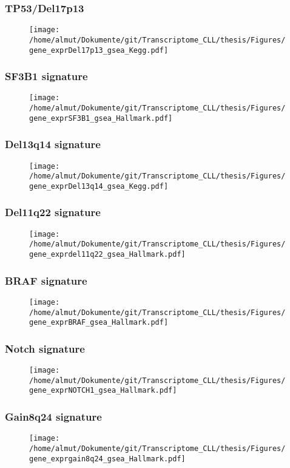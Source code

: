 \documentclass[xcolor=dvipsnames,t,10pt]{beamer}
\begin{document}
%
%
\begin{frame}[c]
	\frametitle{TP53/Del17p13}
	\begin{figure}
		\centering
		\texttt{[image: /home/almut/Dokumente/git/Transcriptome\_CLL/thesis/Figures/gene\_exprDel17p13\_gsea\_Kegg.pdf]}
	\end{figure}
\end{frame}
%
%
\begin{frame}[c]
	\frametitle{SF3B1 signature}
	\begin{figure}
		\centering
		\texttt{[image: /home/almut/Dokumente/git/Transcriptome\_CLL/thesis/Figures/gene\_exprSF3B1\_gsea\_Hallmark.pdf]}
	\end{figure}
\end{frame}
%
%
\begin{frame}[c]
	\frametitle{Del13q14 signature}
	\begin{figure}
		\centering
		\texttt{[image: /home/almut/Dokumente/git/Transcriptome\_CLL/thesis/Figures/gene\_exprDel13q14\_gsea\_Kegg.pdf]}
	\end{figure}
\end{frame}
%
%
\begin{frame}[c]
	\frametitle{Del11q22 signature}
	\begin{figure}
		\centering
		\texttt{[image: /home/almut/Dokumente/git/Transcriptome\_CLL/thesis/Figures/gene\_exprdel11q22\_gsea\_Hallmark.pdf]}
	\end{figure}
\end{frame}
%
% 
\begin{frame}[c]
	\frametitle{BRAF signature}
	\begin{figure}
		\centering
		\texttt{[image: /home/almut/Dokumente/git/Transcriptome\_CLL/thesis/Figures/gene\_exprBRAF\_gsea\_Hallmark.pdf]}
	\end{figure}
\end{frame}
%
% 
\begin{frame}[c]
	\frametitle{Notch signature}
	\begin{figure}
		\centering
		\texttt{[image: /home/almut/Dokumente/git/Transcriptome\_CLL/thesis/Figures/gene\_exprNOTCH1\_gsea\_Hallmark.pdf]}
	\end{figure}
\end{frame}
%
% 
\begin{frame}[c]
	\frametitle{Gain8q24 signature}
	\begin{figure}
		\centering
		\texttt{[image: /home/almut/Dokumente/git/Transcriptome\_CLL/thesis/Figures/gene\_exprgain8q24\_gsea\_Hallmark.pdf]}
	\end{figure}
\end{frame}
\end{document}

